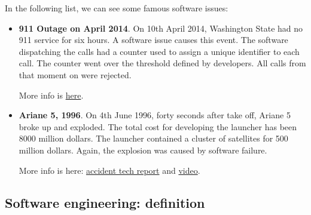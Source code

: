 \documentclass[a4paper]{article}
\newcommand{\example}[1]{\textcolor{Green4}{\textbf{#1}}}
\newcommand{\highspace}{\vspace{1.2em}\noindent}
\begin{document}
    \highspace
    In the following list, we can see some famous software issues:
    \begin{itemize}
        \item \example{911 Outage on April 2014}. On 10th April 2014, Washington State had no 911 service for six hours. A software issue causes this event. The software dispatching the calls had a counter used to assign a unique identifier to each call. The counter went over the threshold defined by developers. All calls from that moment on were rejected.
        
        More info is \href{https://www.theatlantic.com/technology/archive/2017/09/saving-the-world-from-code/540393/}{here}.

        \item \example{Ariane 5, 1996}. On 4th June 1996, forty seconds after take off, Ariane 5 broke up and exploded. The total cost for developing the launcher has been 8000 million dollars. The launcher contained a cluster of satellites for 500 million dollars. Again, the explosion was caused by software failure. 
        
        More info is here: \href{http://sunnyday.mit.edu/accidents/Ariane5accidentreport.html}{accident tech report} and \href{https://www.youtube.com/watch?v=PK_yguLapgA}{video}.
    \end{itemize}

    \newpage

    \subsection{Software engineering: definition}
\end{document}
